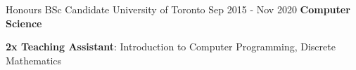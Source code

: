 
\begin{cventries}
  \cventry
    {Honours BSc Candidate}
    {University of Toronto}
    {}
    {Sep 2015 - Nov 2020}
    {\textbf{Computer Science}}
    {
      \begin{cvitems}
        \item {\textbf{2x Teaching Assistant}: Introduction to Computer Programming, Discrete Mathematics}
      \end{cvitems}
    }
\end{cventries}
